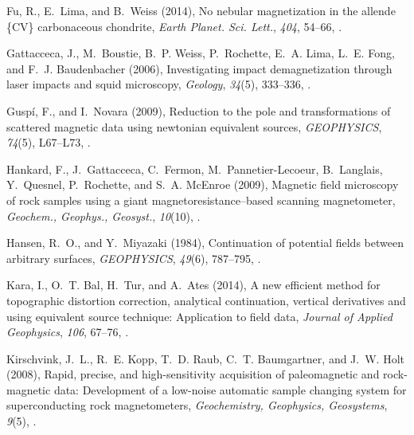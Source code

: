 \documentclass[galley,gc]{agutex}
\begin{document}
\begin{article}
\begin{thebibliography}{42}
Fu, R., E.~Lima, and B.~Weiss (2014), No nebular magnetization in the allende
  \{CV\} carbonaceous chondrite, \textit{Earth Planet. Sci. Lett.},
  \textit{404}, 54--66, .

Gattacceca, J., M.~Boustie, B.~P. Weiss, P.~Rochette, E.~A. Lima, L.~E. Fong,
  and F.~J. Baudenbacher (2006), Investigating impact demagnetization through
  laser impacts and squid microscopy, \textit{Geology}, \textit{34}(5),
  333--336, .

Gusp\'{i}, F., and I.~Novara (2009), Reduction to the pole and transformations
  of scattered magnetic data using newtonian equivalent sources,
  \textit{GEOPHYSICS}, \textit{74}(5), L67--L73, .

Hankard, F., J.~Gattacceca, C.~Fermon, M.~Pannetier-Lecoeur, B.~Langlais,
  Y.~Quesnel, P.~Rochette, and S.~A. McEnroe (2009), Magnetic field microscopy
  of rock samples using a giant magnetoresistance–based scanning
  magnetometer, \textit{Geochem., Geophys., Geosyst.}, \textit{10}(10),
  .

Hansen, R.~O., and Y.~Miyazaki (1984), Continuation of potential fields between
  arbitrary surfaces, \textit{GEOPHYSICS}, \textit{49}(6), 787--795,
  .

Kara, I., O.~T. Bal, H.~Tur, and A.~Ates (2014), A new efficient method for
  topographic distortion correction, analytical continuation, vertical
  derivatives and using equivalent source technique: Application to field data,
  \textit{Journal of Applied Geophysics}, \textit{106}, 67--76,
  .

Kirschvink, J.~L., R.~E. Kopp, T.~D. Raub, C.~T. Baumgartner, and J.~W. Holt
  (2008), Rapid, precise, and high-sensitivity acquisition of paleomagnetic and
  rock-magnetic data: Development of a low-noise automatic sample changing
  system for superconducting rock magnetometers, \textit{Geochemistry,
  Geophysics, Geosystems}, \textit{9}(5), .


\end{thebibliography}
\end{article}
\end{document}
